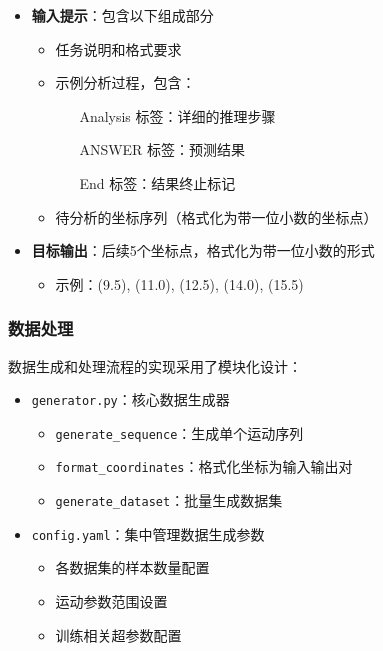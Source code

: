 \documentclass[a4paper, 12pt]{article}
\begin{document}
\begin{itemize}
    \item \textbf{输入提示}：包含以下组成部分
        \begin{itemize}
            \item 任务说明和格式要求
            \item 示例分析过程，包含：
                \begin{itemize}
                    \item [Analysis]标签：详细的推理步骤
                    \item [ANSWER]标签：预测结果
                    \item [End]标签：结果终止标记
                \end{itemize}
            \item 待分析的坐标序列（格式化为带一位小数的坐标点）
        \end{itemize}
    
    \item \textbf{目标输出}：后续5个坐标点，格式化为带一位小数的形式
        \begin{itemize}
            \item 示例：(9.5), (11.0), (12.5), (14.0), (15.5)
        \end{itemize}
\end{itemize}

\subsubsection{数据处理}
数据生成和处理流程的实现采用了模块化设计：

\begin{itemize}
    \item \texttt{generator.py}：核心数据生成器
        \begin{itemize}
            \item \texttt{generate\_sequence}：生成单个运动序列
            \item \texttt{format\_coordinates}：格式化坐标为输入输出对
            \item \texttt{generate\_dataset}：批量生成数据集
        \end{itemize}
    \item \texttt{config.yaml}：集中管理数据生成参数
        \begin{itemize}
            \item 各数据集的样本数量配置
            \item 运动参数范围设置
            \item 训练相关超参数配置
        \end{itemize}
\end{itemize}
\end{document}
